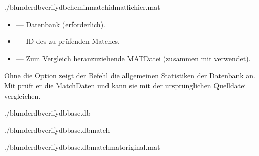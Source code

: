 \documentclass[letterpaper,10pt,german]{sphinxmanual}
\begin{document}
\begin{sphinxVerbatim}[commandchars=\\\{\}]
./blunderdbverify\PYGZhy{}\PYGZhy{}db\PYGZlt{}chemin\PYGZgt{}\PYG{o}{[}\PYGZhy{}\PYGZhy{}match\PYGZlt{}id\PYGZgt{}\PYG{o}{]}\PYG{o}{[}\PYGZhy{}\PYGZhy{}mat\PYGZlt{}fichier.mat\PYGZgt{}\PYG{o}{]}
\end{sphinxVerbatim}

\sphinxAtStartPar
{}
\begin{itemize}
\item {} 
\sphinxAtStartPar
{} — Datenbank (erforderlich).

\item {} 
\sphinxAtStartPar
{} — ID des zu prüfenden Matches.

\item {} 
\sphinxAtStartPar
{} — Zum Vergleich heranzuziehende MAT\sphinxhyphen{}Datei (zusammen mit  verwendet).

\end{itemize}

\sphinxAtStartPar
Ohne die Option  zeigt der Befehl die allgemeinen Statistiken der Datenbank an. Mit  prüft er die Match\sphinxhyphen{}Daten und kann sie mit der ursprünglichen Quelldatei vergleichen.

\sphinxAtStartPar
{}

\begin{sphinxVerbatim}[commandchars=\\\{\}]
./blunderdbverify\PYGZhy{}\PYGZhy{}dbbase.db

./blunderdbverify\PYGZhy{}\PYGZhy{}dbbase.db\PYGZhy{}\PYGZhy{}match

./blunderdbverify\PYGZhy{}\PYGZhy{}dbbase.db\PYGZhy{}\PYGZhy{}match\PYGZhy{}\PYGZhy{}matoriginal.mat
\end{sphinxVerbatim}
\end{document}

